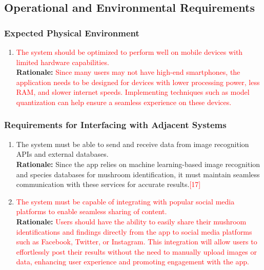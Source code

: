 \documentclass{article}
\begin{document}

\subsection{Operational and Environmental Requirements}
\label{sub:operational_and_environmental_requirements}

\subsubsection{Expected Physical Environment}
\label{ssub:expected_physical_environment}
\begin{enumerate}[{OE-EPE}1. ]
	\item \textcolor{red}{The system should be optimized to perform well on mobile devices with limited hardware capabilities.}\\
	\textbf{Rationale:} \textcolor{red}{Since many users may not have high-end smartphones, the application needs to be designed for devices with lower processing power, less RAM, and slower internet speeds. Implementing techniques such as model quantization can help ensure a seamless experience on these devices.}\\
\end{enumerate}

\subsubsection{Requirements for Interfacing with Adjacent Systems}
\label{ssub:requirements_for_interfacing_with_adjacent_systems}
\begin{enumerate}[{OE-IA}1. ]
	\item The system must be able to send and receive data from image recognition APIs and external databases.\\
	\textbf{Rationale:} Since the app relies on machine learning-based image recognition and species databases for mushroom identification, it must maintain seamless communication with these services for accurate results.\textcolor{red}{[17]}
	\item \textcolor{red}{The system must be capable of integrating with popular social media platforms to enable seamless sharing of content.}\\
	\textbf{Rationale:} \textcolor{red}{Users should have the ability to easily share their mushroom identifications and findings directly from the app to social media platforms such as Facebook, Twitter, or Instagram. This integration will allow users to effortlessly post their results without the need to manually upload images or data, enhancing user experience and promoting engagement with the app.}\\
\end{enumerate}
\end{document}
